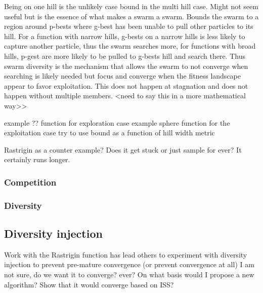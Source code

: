 Being on one hill is the unlikely case bound in the multi hill case.
Might not seem useful but is the essence of what makes a swarm a swarm.
Bounds the swarm to a region around p-bests where g-best has been unable to pull other particles to its hill.
For a function with narrow hills, g-bests on a narrow hills is less likely to capture another particle, thus the swarm searches more, for functions with broad hills, p-gest are more likely to be pulled to g-bests hill and search there.
Thus swarm diversity is the mechanism that allows the swarm to not converge when searching is likely needed but focus and converge when the fitness landscape appear to favor exploitation.
This does not happen at stagnation and does not happen without multiple members. <need to say this in a more mathematical way>>

example ?? function for exploration case
example sphere function for the exploitation case
try to use bound as a function of hill width metric

Rastrigin as a counter example? Does it get stuck or just sample for ever? It certainly runs longer.

\subsubsection{Competition}



\subsubsection{Diversity}


\subsection{Diversity injection}

Work with the Rastrigin function has lead others to experiment with diversity injection to prevent pre-mature convergence (or prevent convergence at all)
I am not sure, do we want it to converge? ever?
On what basis would I propose a new algorithm?
Show that it would converge based on ISS?